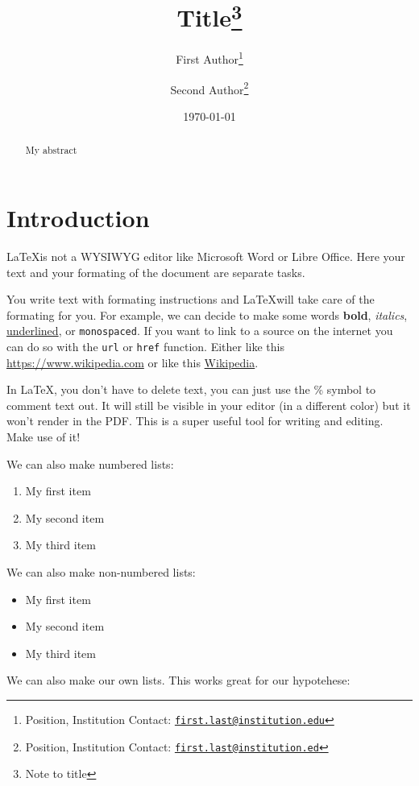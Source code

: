 \documentclass{article}
\title{Title\footnote{Note to title}}
\author{First  Author\footnote{Position, Institution Contact: \texttt{\href{mailto:first.last@institution.edu}{first.last@institution.edu}}}
\and
Second  Author\footnote{Position, Institution Contact:  \texttt{\href{mailto:first.last@institution.ed}{first.last@institution.ed}}}}
\date{\today}
\begin{document}
\maketitle

\begin{abstract}
My abstract
\end{abstract}


\newpage
\tableofcontents

\newpage
\section{Introduction}
\label{sec:intro}

\LaTeX is not a WYSIWYG editor like Microsoft Word or Libre Office. Here your text and your formating of the document are separate tasks. 

You write text with formating instructions and \LaTeX will take care of the formating for you. For example, we can decide to make some words \textbf{bold}, \textit{italics}, \underline{underlined}, or \texttt{monospaced}. If you want to link to a source on the internet you can do so with the \texttt{url} or \texttt{href} function. Either like this \url{https://www.wikipedia.com} or like this \href{https://www.wikipedia.com}{Wikipedia}.

In \LaTeX, you don't have to delete text, you can just use the \% symbol to comment text out. It will still be visible in your editor (in a different color) but it won't render in the PDF. This is a super useful tool for writing and editing. Make use of it!


We can also make numbered lists:

\begin{enumerate}
    \item My first item
    \item My second item
    \item My third item
\end{enumerate} 


We can also make non-numbered lists:


\begin{itemize}
    \item My first item
    \item My second item
    \item My third item
\end{itemize} 

We can also make our own lists. This works great for our hypotehese:
\end{document}
